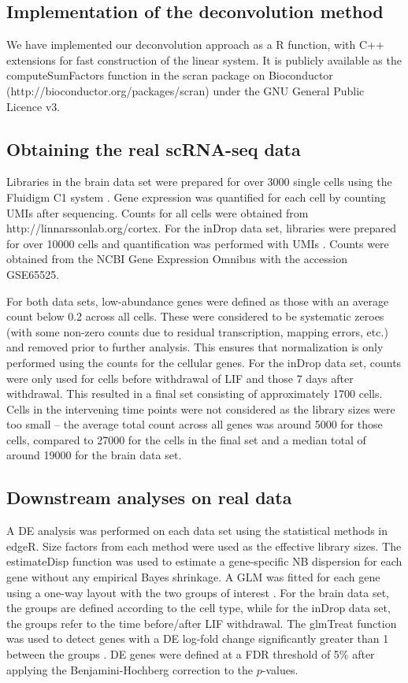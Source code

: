\documentclass{bmcart}
\newcommand{\revised}[1]{#1}
\begin{document}
\subsection*{Implementation of the deconvolution method}
We have implemented our deconvolution approach as a R function, with C++ extensions for fast construction of the linear system.
\revised{It is publicly available as the computeSumFactors function in the scran package on Bioconductor ({http://bioconductor.org/packages/scran}) under the GNU General Public Licence v3.}

\subsection*{Obtaining the real scRNA-seq data}
Libraries in the brain data set were prepared for over 3000 single cells using the Fluidigm C1 system \cite{zeisel2015brain}.
Gene expression was quantified for each cell by counting UMIs after sequencing.
Counts for all cells were obtained from {http://linnarssonlab.org/cortex}.
For the inDrop data set, libraries were prepared for over 10000 cells and quantification was performed with UMIs \cite{klein2015droplet}.
Counts were obtained from the NCBI Gene Expression Omnibus with the accession GSE65525.

For both data sets, low-abundance genes were defined as those with an average count below 0.2 across all cells.
These were considered to be systematic zeroes (with some non-zero counts due to residual transcription, mapping errors, etc.) and removed prior to further analysis.
This ensures that normalization is only performed using the counts for the cellular genes.
For the inDrop data set, counts were only used for cells before withdrawal of LIF and those 7 days after withdrawal.
This resulted in a final set consisting of approximately 1700 cells.
Cells in the intervening time points were not considered as the library sizes were too small -- the average total count across all genes was around 5000 for those cells,
    compared to 27000 for the cells in the final set and a median total of around 19000 for the brain data set.

\subsection*{Downstream analyses on real data}
A DE analysis was performed on each data set using the statistical methods in edgeR.
Size factors from each method were used as the effective library sizes.
The estimateDisp function was used to estimate a gene-specific NB dispersion for each gene \cite{chen2014differential} without any empirical Bayes shrinkage.
A \revised{GLM} was fitted for each gene using a one-way layout with the two groups of interest \cite{mccarthy2012differential}.
For the brain data set, the groups are defined according to the cell type, while for the inDrop data set, the groups refer to the time before/after LIF withdrawal.
The glmTreat function was used to detect genes with a DE log-fold change significantly greater than 1 between the groups \cite{mccarthy2009testing}.
DE genes were defined at a FDR threshold of 5\% after applying the Benjamini-Hochberg correction to the $p$-values.
\end{document}
